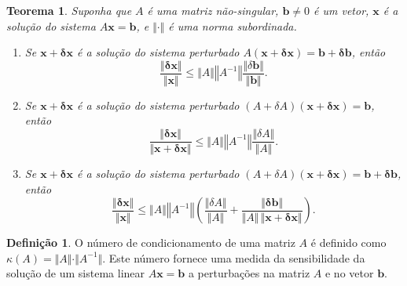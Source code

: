 \documentclass{article}
\theoremstyle{plain}
\newtheorem{thm}{Teorema}[section]
\theoremstyle{definition}
\newtheorem{defn}{Definição}[section]
\theoremstyle{remark}
\begin{document}
\begin{thm}
  Suponha que \(A\) é uma matriz não-singular, \(\mathbf{b} \neq 0\) é um vetor, \(\mathbf{x}\) é a solução do sistema \(A\mathbf{x} = \mathbf{b}  \), e \(\Vert\cdot\Vert\) é uma norma subordinada.
  \begin{enumerate}
    \item [1.] Se \( \mathbf{x + \delta x} \) é a solução do sistema perturbado \(A( \mathbf{x + \delta x} ) = \mathbf{b + \delta b}\), então
    \begin{equation}\label{eq:cond1}
      \frac{\Vert \mathbf{\delta x} \Vert}{\Vert \mathbf{x}  \Vert} \leq \Vert A \Vert \left\Vert A^{-1} \right\Vert \frac{\Vert \delta \mathbf{b} \Vert}{\Vert \mathbf{b} \Vert}.
    \end{equation}
    \item [2.] Se \( \mathbf{x + \delta x} \) é a solução do sistema perturbado \((A+\delta A)( \mathbf{x + \delta x} ) = \mathbf{b}\), então
    \begin{equation}\label{eq:cond2}
      \frac{\Vert \mathbf{\delta x} \Vert}{\Vert  \mathbf{x + \delta x}  \Vert} \leq \Vert A \Vert \left\Vert A^{-1} \right\Vert \frac{\Vert \delta A \Vert}{\Vert A \Vert}.
    \end{equation}
    \item [3.] Se \( \mathbf{x + \delta x} \) é a solução do sistema perturbado \((A+\delta A)( \mathbf{x + \delta x} ) = \mathbf{b + \delta b}\), então
    \begin{equation}
      \frac{\Vert \mathbf{\delta x} \Vert}{\Vert \mathbf{x}  \Vert} \leq \Vert A \Vert \left\Vert A^{-1} \right\Vert \left(\frac{\Vert \delta A \Vert}{\Vert A \Vert} + \frac{\Vert \mathbf{\delta b} \Vert}{\Vert A \Vert\, \Vert  \mathbf{x + \delta x}  \Vert}\right).
    \end{equation}
  \end{enumerate}
\end{thm}

\begin{defn}
  O número de condicionamento de uma matriz \(A\) é definido como \(\kappa(A) = \Vert A \Vert \cdot \Vert A^{-1} \Vert\). Este número fornece uma medida da sensibilidade da solução de um sistema linear \(A\mathbf{x} = \mathbf{b}\) a perturbações na matriz \(A\) e no vetor \(\mathbf{b}\).
\end{defn}
\end{document}
